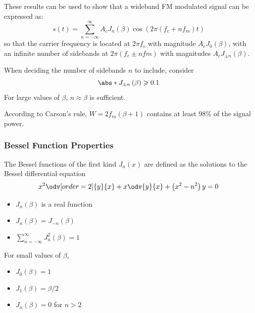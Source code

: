 \documentclass{article}
\begin{document}
These results can be used to show that a wideband FM modulated signal
can be expressed as:
\begin{equation*}
    s\left( t \right) = \sum_{n = -\infty}^\infty A_c J_n\left( \beta \right) \cos{\left( 2 \pi \left( f_c + n f_m \right) t \right)}
\end{equation*}
so that the carrier frequency is located at \(2 \pi f_c\) with magnitude \(A_c J_0\left( \beta \right)\), with an
infinite number of sidebands at \(2 \pi \left( f_c \pm n fm \right)\) with magnitudes \(A_c J_{\pm n}\left( \beta \right)\).

When deciding the number of sidebands \(n\) to include, consider
\begin{equation*}
    \abs*{J_{\pm n}\left( \beta \right)} \geqslant 0.1
\end{equation*}
For large values of \(\beta\), \(n \approx \beta\) is sufficient.

According to Carson's rule, \(W = 2 f_m \left( \beta + 1 \right)\)
contains at least \(98\%\) of the signal power.
\subsubsection{Bessel Function Properties}
The Bessel functions of the first kind \(J_n\left( x \right)\) are
defined as the solutions to the Bessel differential equation
\begin{equation*}
    x^2 \odv[order=2]{y}{x} + x \odv{y}{x} + \left( x^2 - n^2 \right) y = 0
\end{equation*}
\begin{itemize}
    \item \(J_n\left( \beta \right)\) is a real function
    \item \(J_n\left( \beta \right) = J_{-n}\left( \beta \right)\)
    \item \(\sum_{n = -\infty}^\infty J_n^2\left( \beta \right) = 1\)
\end{itemize}
For small values of \(\beta\),
\begin{itemize}
    \item \(J_0\left( \beta \right) = 1\)
    \item \(J_1\left( \beta \right) = \beta/2\)
    \item \(J_n\left( \beta \right) = 0\) for \(n > 2\)
\end{itemize}
\end{document}
